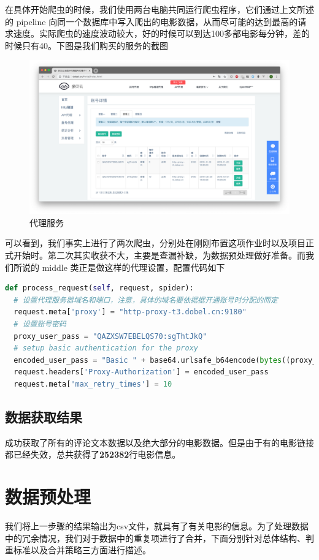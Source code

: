 \documentclass{ctexrep}
\begin{document}
	在具体开始爬虫的时候，我们使用两台电脑共同运行爬虫程序，它们通过上文所述的 pipeline 向同一个数据库中写入爬出的电影数据，从而尽可能的达到最高的请求速度。实际爬虫的速度波动较大，好的时候可以到达100多部电影每分钟，差的时候只有40。下图是我们购买的服务的截图\begin{figure}[H]
		\centering
		\includegraphics[width=0.7\linewidth]{img/proxy_pay}
		\caption{代理服务}
		\label{fig:proxypay}
	\end{figure}
	可以看到，我们事实上进行了两次爬虫，分别处在刚刚布置这项作业时以及项目正式开始时。第二次其实收获不大，主要是查漏补缺，为数据预处理做好准备。而我们所说的 middle 类正是做这样的代理设置，配置代码如下\begin{lstlisting}[language=python]
def process_request(self, request, spider):
  # 设置代理服务器域名和端口，注意，具体的域名要依据据开通账号时分配的而定
  request.meta['proxy'] = "http-proxy-t3.dobel.cn:9180"
  # 设置账号密码
  proxy_user_pass = "QAZXSW7EBELQS70:sgThtJkQ"
  # setup basic authentication for the proxy
  encoded_user_pass = "Basic " + base64.urlsafe_b64encode(bytes((proxy_user_pass), "ascii")).decode("utf8")
  request.headers['Proxy-Authorization'] = encoded_user_pass
  request.meta['max_retry_times'] = 10
	\end{lstlisting}
	\section{数据获取结果}
	成功获取了所有的评论文本数据以及绝大部分的电影数据。但是由于有的电影链接都已经失效，总共获得了\textbf{252382}行电影信息。
	
	\chapter{数据预处理}
	我们将上一步骤的结果输出为csv文件，就具有了有关电影的信息。为了处理数据中的冗余情况，我们对于数据中的重复项进行了合并，下面分别针对总体结构、判重标准以及合并策略三方面进行描述。
\end{document}
